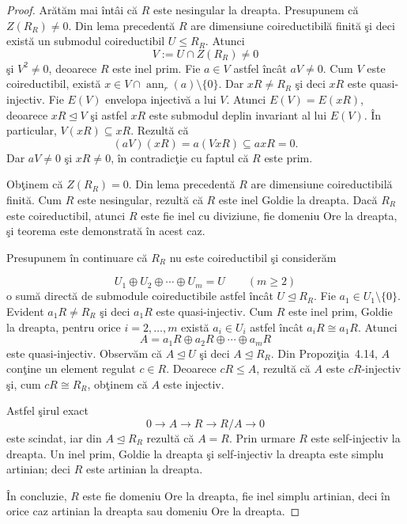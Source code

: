 \documentclass[12pt,a4paper]{book}
\DeclareMathOperator{\ann}{ann}
\newcommand{\ess}{\trianglelefteq}  %
\theoremstyle{plain}
\theoremstyle{definition}
\theoremstyle{remark}
\begin{document}
\begin{proof}
Arătăm mai întâi că \(R\) este nesingular la dreapta. Presupunem că
\(Z(R_R) \neq 0\). Din lema precedentă \(R\) are dimensiune
coireductibilă finită şi deci există un submodul coireductibil
\(U \leq R_R\). Atunci
\[
  V := U \cap Z(R_R) \neq 0
\]
şi \(V^2 \neq 0\), deoarece \(R\) este inel prim. Fie \(a \in V\) astfel
încât \(aV \neq 0\). Cum \(V\) este coireductibil, există
\(x \in V \cap \ann_r(a) \setminus \{0\}\). Dar \(xR \neq R_R\) şi deci
\(xR\) este quasi-injectiv. Fie \(E(V)\) envelopa injectivă a lui \(V\).
Atunci \(E(V) = E(xR)\), deoarece \(xR \ess V\) şi astfel \(xR\) este
submodul deplin invariant al lui \(E(V)\). În particular,
\(V(xR) \subseteq xR\). Rezultă că
\[
  (aV)(xR) = a(VxR) \subseteq axR = 0.
\]
Dar \(aV \neq 0\) şi \(xR \neq 0\), în contradicţie cu faptul că
\(R\) este prim.

Obţinem că \(Z(R_R) = 0\). Din lema precedentă \(R\) are dimensiune
coireductibilă finită. Cum \(R\) este nesingular, rezultă că \(R\) este
inel Goldie la dreapta. Dacă \(R_R\) este coireductibil, atunci
\(R\) este fie inel cu diviziune, fie domeniu Ore la dreapta, şi
teorema este demonstrată în acest caz.

Presupunem în continuare că \(R_R\) nu este coireductibil şi considerăm

\[
  U_1 \oplus U_2 \oplus \cdots \oplus U_m = U \qquad (m \geq 2)
\]
o sumă directă de submodule coireductibile astfel încât \(U \ess R_R\).
Fie \(a_1 \in U_1 \setminus \{0\}\). Evident \(a_1 R \neq R_R\) şi deci
\(a_1 R\) este quasi-injectiv. Cum \(R\) este inel prim, Goldie la
dreapta, pentru orice \(i = 2,\dots,m\) există
\(a_i \in U_i\) astfel încât \(a_i R \cong a_1 R\). Atunci
\[
  A = a_1 R \oplus a_2 R \oplus \cdots \oplus a_m R
\]
este quasi-injectiv. Observăm că \(A \ess U\) şi deci \(A \ess R_R\).
Din Propoziţia~4.14, \(A\) conţine un element regulat \(c \in R\).
Deoarece \(cR \leq A\), rezultă că \(A\) este \(cR\)-injectiv şi, cum
\(cR \cong R_R\), obţinem că \(A\) este injectiv.

Astfel şirul exact
\[
  0 \longrightarrow A \longrightarrow R \longrightarrow R/A \longrightarrow 0
\]
este scindat, iar din \(A \ess R_R\) rezultă că \(A = R\). Prin urmare
\(R\) este self-injectiv la dreapta. Un inel prim, Goldie la dreapta şi
self-injectiv la dreapta este simplu artinian; deci \(R\) este artinian
la dreapta.

În concluzie, \(R\) este fie domeniu Ore la dreapta, fie inel simplu
artinian, deci în orice caz artinian la dreapta sau domeniu Ore la
dreapta.
\end{proof}
\end{document}
